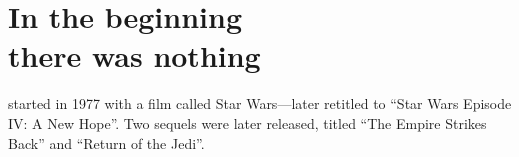 
\part[In the beginning there was nothing]{In the beginning\\there was nothing}
	\label{part:nature-inspired-metaheuristics}%



 started in 1977 with a film called Star Wars---later retitled to ``Star Wars Episode IV: A New Hope''.  Two sequels were later released, titled ``The Empire Strikes Back'' and ``Return of the Jedi''.

